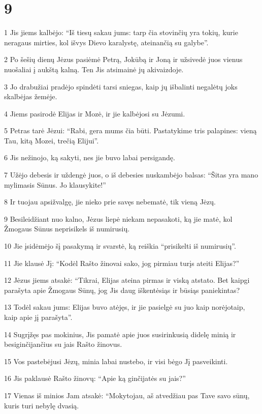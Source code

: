 \chapter{9}


\par 1 Jis jiems kalbėjo: “Iš tiesų sakau jums: tarp čia stovinčių yra tokių, kurie neragaus mirties, kol išvys Dievo karalystę, ateinančią su galybe”. 
\par 2 Po šešių dienų Jėzus pasiėmė Petrą, Jokūbą ir Joną ir užsivedė juos vienus nuošaliai į aukštą kalną. Ten Jis atsimainė jų akivaizdoje. 
\par 3 Jo drabužiai pradėjo spindėti tarsi sniegas, kaip jų išbalinti negalėtų joks skalbėjas žemėje. 
\par 4 Jiems pasirodė Elijas ir Mozė, ir jie kalbėjosi su Jėzumi. 
\par 5 Petras tarė Jėzui: “Rabi, gera mums čia būti. Pastatykime tris palapines: vieną Tau, kitą Mozei, trečią Elijui”. 
\par 6 Jis nežinojo, ką sakyti, nes jie buvo labai persigandę. 
\par 7 Užėjo debesis ir uždengė juos, o iš debesies nuskambėjo balsas: “Šitas yra mano mylimasis Sūnus. Jo klausykite!” 
\par 8 Ir tuojau apsižvalgę, jie nieko prie savęs nebematė, tik vieną Jėzų. 
\par 9 Besileidžiant nuo kalno, Jėzus liepė niekam nepasakoti, ką jie matė, kol Žmogaus Sūnus neprisikels iš numirusių. 
\par 10 Jie įsidėmėjo šį pasakymą ir svarstė, ką reiškia “prisikelti iš numirusių”. 
\par 11 Jie klausė Jį: “Kodėl Rašto žinovai sako, jog pirmiau turįs ateiti Elijas?” 
\par 12 Jėzus jiems atsakė: “Tikrai, Elijas ateina pirmas ir viską atstato. Bet kaipgi parašyta apie Žmogaus Sūnų, jog Jis daug iškentėsiąs ir būsiąs paniekintas? 
\par 13 Todėl sakau jums: Elijas buvo atėjęs, ir jie pasielgė su juo kaip norėjo­taip, kaip apie jį parašyta”. 
\par 14 Sugrįžęs pas mokinius, Jis pamatė apie juos susirinkusią didelę minią ir besiginčijančius su jais Rašto žinovus. 
\par 15 Vos pastebėjusi Jėzų, minia labai nustebo, ir visi bėgo Jį pasveikinti. 
\par 16 Jis paklausė Rašto žinovų: “Apie ką ginčijatės su jais?” 
\par 17 Vienas iš minios Jam atsakė: “Mokytojau, aš atvedžiau pas Tave savo sūnų, kuris turi nebylę dvasią. 
